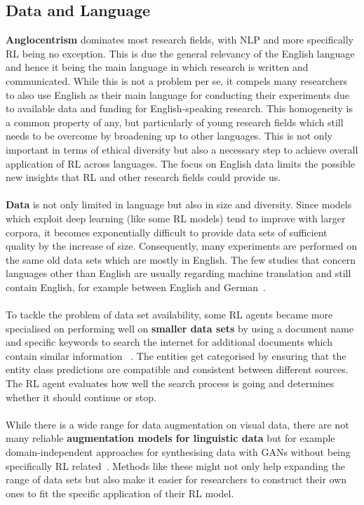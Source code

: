\documentclass[11pt]{article}
\begin{document}
\subsection{Data and Language}\label{data}
\textbf{Anglocentrism} dominates most research fields, with NLP and more specifically RL being no exception. This is due the general relevancy of the English language and hence it being the main language in which research is written and communicated. While this is not a problem per se, it compels many researchers to also use English as their main language for conducting their experiments due to available data and funding for English-speaking research. This homogeneity is a common property of any, but particularly of young research fields which still needs to be overcome by broadening up to other languages. This is not only important in terms of ethical diversity but also a necessary step to achieve overall application of RL across languages. The focus on English data limits the possible new insights that RL and other research fields could provide us.\\\\
\textbf{Data} is not only limited in language but also in size and diversity. Since models which exploit deep learning (like some RL models) tend to improve with larger corpora, it becomes exponentially difficult to provide data sets of sufficient quality by the increase of size. Consequently, many experiments are performed on the same old data sets which are mostly in English. The few studies that concern languages other than English are usually regarding machine translation and still contain English, for example between English and German~\cite{yasui-etal-2019}. \\\\
To tackle the problem of data set availability, some RL agents became more specialised on performing well on \textbf{smaller data sets} by using a document name and specific keywords to search the internet for additional documents which contain similar information ~\cite{narasimhan-etal-2016-improving}. The entities get categorised by ensuring that the entity class predictions are compatible and consistent between different sources. The RL agent evaluates how well the search process is going and determines whether it should continue or stop.\\\\
While there is a wide range for data augmentation on visual data, there are not many reliable \textbf{augmentation models for linguistic data} but for example domain-independent approaches for synthesising data with GANs without being specifically RL related~\cite{yoon-2018-pategan}. Methods like these might not only help expanding the range of data sets but also make it easier for researchers to construct their own ones to fit the specific application of their RL model.\\\\
\end{document}
